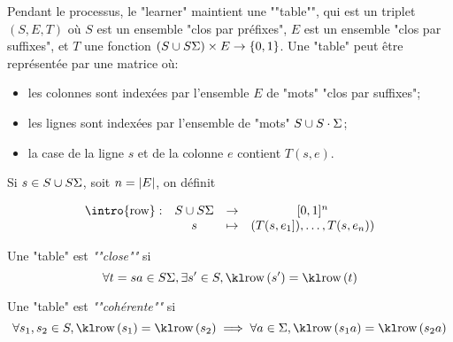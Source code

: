 Pendant le processus, le "learner" maintient une ""table"", qui est un triplet $(S,E,T)$ où $S$ est un ensemble "clos par préfixes",
$E$ est un ensemble "clos par suffixes", et $T$ une fonction $(S \cup S\Sigma) \times E \to \left\{0,1\right\}$. Une "table" peut être
représentée par une matrice où:
\begin{itemize}
	\item les colonnes sont indexées par l'ensemble $E$ de "mots" "clos par suffixes";
	\item les lignes sont indexées par l'ensemble de "mots" $S \cup S\cdot \Sigma$;
	\item la case de la ligne $s$ et de la colonne $e$ contient $T(s,e)$.
\end{itemize}


\begin{definition}
	Si $s \in S \cup S\Sigma$, soit $n = \left|E\right|$, on définit

	$$ \begin{array}{cccc}
			\text{\intro{row}}: & S\cup S\alphabet & \to     & [0,1]^n                        \\
			                    & s                & \mapsto & (T(s,e_1]), \ldots, T(s, e_n))
		\end{array}$$


\end{definition}

\begin{definition}
	Une "table" est \emph{""close""} si
	$$ \forall t = sa \in S\alphabet, \exists s'\in S, \row {s'} = \row t$$
\end{definition}

\begin{definition}
	Une "table" est \emph{""cohérente""} si
	$$ \forall s_1, s_2 \in S, \row{s_1} = \row{s_2} \implies \forall a \in \alphabet, \row{s_1a} = \row{s_2a}$$
\end{definition}


